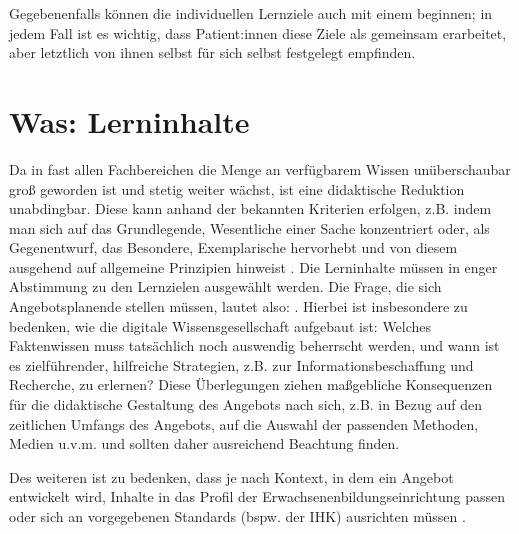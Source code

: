 \documentclass[
  twoside,
  parskip=half-,
  paper=176mm:246mm,
  BCOR=14mm,
  DIV=14,
]{scrreprt}
\begin{document}
Gegebenenfalls können die individuellen Lernziele auch mit einem  beginnen; in jedem Fall ist es wichtig, dass Patient:innen diese Ziele als gemeinsam erarbeitet, aber letztlich von ihnen selbst für sich selbst festgelegt empfinden.


\section{Was: Lerninhalte}\label{sec:was}

Da in fast allen Fachbereichen die Menge an verfügbarem Wissen unüberschaubar groß geworden ist und
stetig weiter wächst, ist eine didaktische Reduktion unabdingbar. Diese kann anhand der bekannten
Kriterien erfolgen, z.B. indem man sich auf das Grundlegende, Wesentliche einer Sache konzentriert
oder, als Gegenentwurf, das Besondere, Exemplarische hervorhebt und von diesem ausgehend auf
allgemeine Prinzipien hinweist \autocite[vgl.][23f.]{kos}. Die Lerninhalte müssen in enger
Abstimmung zu den Lernzielen ausgewählt werden. Die Frage, die sich Angebotsplanende stellen müssen,
lautet also: . Hierbei ist insbesondere zu bedenken, wie die digitale Wissensgesellschaft aufgebaut ist: Welches Faktenwissen muss tatsächlich noch auswendig beherrscht werden, und wann ist es zielführender, hilfreiche Strategien, z.B. zur Informationsbeschaffung und Recherche, zu erlernen? Diese Überlegungen ziehen maßgebliche Konsequenzen für die didaktische Gestaltung des Angebots nach sich, z.B. in Bezug auf den zeitlichen Umfangs des Angebots, auf die Auswahl der passenden Methoden, Medien u.v.m. und sollten daher ausreichend Beachtung finden.

Des weiteren ist zu bedenken, dass je nach Kontext, in dem ein Angebot entwickelt wird, Inhalte in das Profil der Erwachsenenbildungseinrichtung passen oder sich an vorgegebenen Standards (bspw. der IHK) ausrichten müssen \autocite[vgl.][1008]{reich-claassen}.
\end{document}
